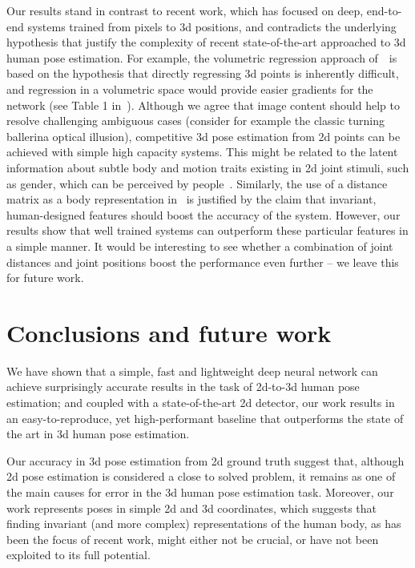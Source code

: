 \documentclass[10pt,twocolumn,letterpaper]{article}
\begin{document}
Our results stand in contrast to recent work, which has focused on deep, end-to-end systems trained from pixels to 3d positions, and contradicts the underlying hypothesis that justify the complexity of recent state-of-the-art approached to 3d human pose estimation.
For example, the volumetric regression approach of~\cite{volumetric}~\etal is based on the hypothesis that directly regressing 3d points is inherently difficult, and regression in a volumetric space would provide easier gradients for the network (see Table 1 in~\cite{volumetric}).
Although we agree that image content should help to resolve challenging ambiguous cases (consider for example the classic turning ballerina optical illusion), competitive 3d pose estimation from 2d points can be achieved with simple high capacity systems. This might be related to the latent information about subtle body and motion traits existing in 2d joint stimuli, such as gender, which can be perceived by people~\cite{troje2006adaptation}.
Similarly, the use of a distance matrix as a body representation in~\cite{distance-matrix} is justified by the claim that invariant, human-designed features should boost the accuracy of the system. However, our results show that well trained systems can outperform these particular features in a simple manner.
It would be interesting to see whether a combination of joint distances and joint positions boost the performance even further -- we leave this for future work.

\section{Conclusions and future work}

We have shown that a simple, fast and lightweight deep neural network can achieve surprisingly accurate results in the task of 2d-to-3d human pose estimation; and coupled with a state-of-the-art 2d detector, our work results in an easy-to-reproduce, yet high-performant baseline that outperforms the state of the art in 3d human pose estimation.

Our accuracy in 3d pose estimation from 2d ground truth suggest that, although 2d pose estimation is considered a close to solved problem, it remains as one of the main causes for error in the 3d human pose estimation task. 
Moreover, our work represents poses in simple 2d and 3d coordinates, which suggests that finding invariant (and more complex) representations of the human body, as has been the focus of recent work, might either not be crucial, or have not been exploited to its full potential.
\end{document}
